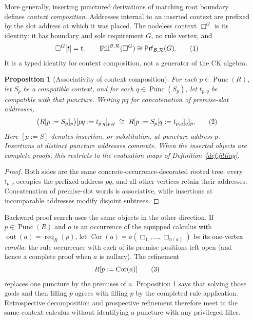 \documentclass[10pt,a4paper]{article}
\theoremstyle{plain}
\newtheorem{proposition}[theorem]{Proposition}
\theoremstyle{definition}
\theoremstyle{remark}
\newcommand{\Base}{\mathcal B}
\newcommand{\Rules}{\mathcal R}
\newcommand{\Fill}{\operatorname{Fill}}
\newcommand{\Req}{\operatorname{req}}
\newcommand{\Punc}{\operatorname{Punc}}
\newcommand{\Prf}{\mathsf{Prf}}
\newcommand{\eqtag}{\refstepcounter{equation}\tag{\theequation}}
\begin{document}
More generally, inserting punctured derivations of matching root boundary
defines \emph{context composition}.  Addresses internal to an inserted
context are prefixed by the slot address at which it was placed.  The
nodeless context \(\Box^G\) is its identity: it has boundary and sole
requirement \(G\), no rule vertex, and
\[
 \Box^G[t]=t,\qquad
 \Fill^{\Base,\Rules}(\Box^G)
       \cong \Prf_{\Base,\Rules}(G).
\eqtag\label{eq:closed-support-as-filling}
\]
It is a typed identity for context composition, not a generator of the CK
algebra.

\begin{proposition}[Associativity of context composition]
\label{prop:context-composition-associativity}
For each \(p\in\Punc(R)\), let \(S_p\) be a compatible context, and for
each \(q\in\Punc(S_p)\), let \(t_{p,q}\) be compatible with that
puncture.  Writing \(pq\) for concatenation of premise-slot addresses,
\[
 \bigl(R[p:=S_p]_p\bigr)[pq:=t_{p,q}]_{p,q}
 \ \cong\
 R[p:=S_p[q:=t_{p,q}]_q]_p .
\eqtag\label{eq:context-composition-associativity}
\]
Here \([p:=S]\) denotes insertion, or substitution, at puncture address
\(p\).  Insertions at distinct puncture addresses commute.  When the
inserted objects are complete proofs, this restricts to the evaluation maps
of Definition~\ref{def:filling}.
\end{proposition}

\begin{proof}
Both sides are the same concrete-occurrence-decorated rooted tree: every
\(t_{p,q}\) occupies the prefixed address \(pq\), and all other vertices
retain their addresses.  Concatenation of premise-slot words is
associative, while insertions at incomparable addresses modify disjoint
subtrees.
\end{proof}

Backward proof search uses the same objects in the other direction.  If
\(p\in\Punc(R)\) and \(a\) is an occurrence of the equipped calculus with
\(\operatorname{out}(a)=\Req_R(p)\), let
\(\operatorname{Cor}(a)=a(\Box_1,\ldots,\Box_{n(a)})\) be its
one-vertex \emph{corolla}: the rule occurrence with each of its premise
positions left open (and hence a complete proof when \(a\) is nullary).  The refinement
\[
                 R[p:=\operatorname{Cor}(a)]
\eqtag\label{eq:backward-refinement}
\]
replaces one puncture by the premises of \(a\).  Proposition
\ref{prop:context-composition-associativity} says that solving those goals and then
filling \(p\) agrees with filling \(p\) by the completed rule application.
Retrospective decomposition and prospective refinement therefore meet in
the same context calculus without identifying a puncture with any privileged
filler.
\end{document}
